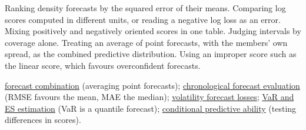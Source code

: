 \begin{qfmethod}
 Ranking density forecasts by the squared error of their means. Comparing log scores computed in different units, or reading a negative log loss as an error. Mixing positively and negatively oriented scores in one table. Judging intervals by coverage alone. Treating an average of point forecasts, with the members' own spread, as the combined predictive distribution. Using an improper score such as the linear score, which favours overconfident forecasts.

 \hyperref[meth:forecast-combination]{forecast combination} (averaging point forecasts); \hyperref[meth:forecast-accuracy-evaluation]{chronological forecast evaluation} (RMSE favours the mean, MAE the median); \hyperref[meth:volatility-forecast-loss]{volatility forecast losses}; \hyperref[meth:var-es-estimation-methods]{VaR and ES estimation} (VaR is a quantile forecast); \hyperref[meth:conditional-predictive-ability]{conditional predictive ability} (testing differences in scores).

\end{qfmethod}

